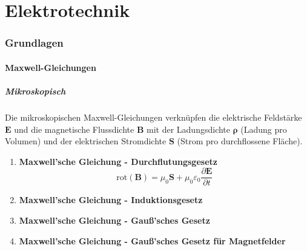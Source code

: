 \part{Elektrotechnik}
	\section{Grundlagen}
		\subsection{Maxwell-Gleichungen}
			\subsubsection{Mikroskopisch}
				Die mikroskopischen Maxwell-Gleichungen verknüpfen die elektrische Feldstärke $ \bm{E} $ und die magnetische Flussdichte $ \bm{B} $ mit der Ladungsdichte $ \bm{\rho} $  (Ladung pro Volumen) und der elektrischen Stromdichte $ \bm{S} $ (Strom pro durchflossene Fläche).
				\begin{enumerate}
					\item \textbf{Maxwell'sche Gleichung - Durchflutungsgesetz}
						 \begin{equation}
						 \boxed{\text{rot} (\bm{B}) = \mu_{0}\bm{S} +  \mu_{0}\varepsilon_{0}\frac{\partial\bm{E}}{\partial t}}
						 \end{equation}
						 
					\item \textbf{Maxwell'sche Gleichung - Induktionsgesetz}
					
	
					\item \textbf{Maxwell'sche Gleichung - Gauß'sches Gesetz}
					
					\item \textbf{Maxwell'sche Gleichung - Gauß'sches Gesetz für Magnetfelder}
				\end{enumerate}
